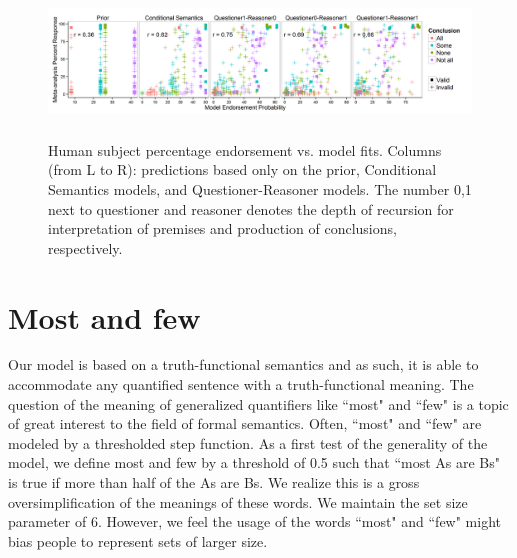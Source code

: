 \documentclass[10pt,letterpaper]{article}
\begin{document}
\begin{figure}[t!] %
\centering
	\subfigure
		\centering
  \includegraphics[width=\textwidth,height=4cm]{fig2_multiScatter_qr5_n6_alpha2}
  \caption{Human subject percentage endorsement vs. model fits.
  Columns (from L to R): predictions based only on the prior, Conditional Semantics models, and Questioner-Reasoner models. The number {0,1} next to questioner and reasoner denotes the depth of recursion for interpretation of premises and production of conclusions, respectively.}
  \label{fig:megaScatter}

\end{figure}






\section{Most and few}

Our model is based on a truth-functional semantics and as such, it is able to accommodate any quantified sentence with a truth-functional meaning. The question of the meaning of generalized quantifiers like ``most" and ``few" is a topic of great interest to the field of formal semantics. Often, ``most" and ``few" are modeled by a thresholded step function. As a first test of the generality of the model, we define most and few by a threshold of 0.5 such that ``most As are Bs" is true if more than half of the As are Bs. We realize this is a gross oversimplification of the meanings of these words. We maintain the set size parameter of 6. However, we feel the usage of the words ``most" and ``few" might bias people to represent sets of larger size.
\end{document}
